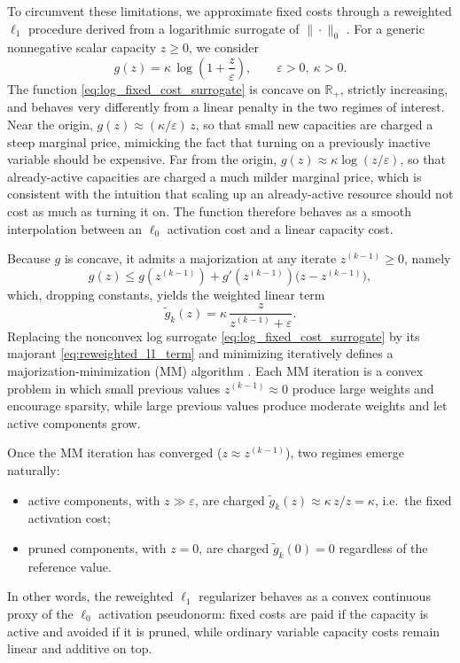 To circumvent these limitations, we approximate fixed costs through a reweighted $\ell_1$ procedure derived from a logarithmic surrogate of $\|\cdot\|_0$ \cite{CandesWakinBoyd2008}. For a generic nonnegative scalar capacity $z\ge 0$, we consider
\begin{equation}
g(z)=\kappa\,\log\!\left(1+\frac{z}{\varepsilon}\right),
\qquad \varepsilon>0,\ \kappa>0.
\label{eq:log_fixed_cost_surrogate}
\end{equation}
The function \eqref{eq:log_fixed_cost_surrogate} is concave on $\mathbb{R}_+$, strictly increasing, and behaves very differently from a linear penalty in the two regimes of interest. Near the origin, $g(z)\approx (\kappa/\varepsilon)\,z$, so that small new capacities are charged a steep marginal price, mimicking the fact that turning on a previously inactive variable should be expensive. Far from the origin, $g(z)\approx\kappa\log(z/\varepsilon)$, so that already-active capacities are charged a much milder marginal price, which is consistent with the intuition that scaling up an already-active resource should not cost as much as turning it on. The function therefore behaves as a smooth interpolation between an $\ell_0$ activation cost and a linear capacity cost.

Because $g$ is concave, it admits a majorization at any iterate $z^{(k-1)}\ge 0$, namely
\begin{equation}
g(z)\le g(z^{(k-1)})+g'(z^{(k-1)})\bigl(z-z^{(k-1)}\bigr),
\label{eq:majorization_log}
\end{equation}
which, dropping constants, yields the weighted linear term
\begin{equation}
\widetilde g_k(z)=\kappa\,\frac{z}{z^{(k-1)}+\varepsilon}.
\label{eq:reweighted_l1_term}
\end{equation}
Replacing the nonconvex log surrogate \eqref{eq:log_fixed_cost_surrogate} by its majorant \eqref{eq:reweighted_l1_term} and minimizing iteratively defines a majorization-minimization (MM) algorithm \cite{CandesWakinBoyd2008,RealRojas2026TRB}. Each MM iteration is a convex problem in which small previous values $z^{(k-1)}\approx 0$ produce large weights and encourage sparsity, while large previous values produce moderate weights and let active components grow.

Once the MM iteration has converged ($z\approx z^{(k-1)}$), two regimes emerge naturally:
\begin{itemize}
\item active components, with $z\gg\varepsilon$, are charged $\widetilde g_k(z)\approx\kappa\,z/z=\kappa$, i.e.\ the fixed activation cost;
\item pruned components, with $z=0$, are charged $\widetilde g_k(0)=0$ regardless of the reference value.
\end{itemize}
In other words, the reweighted $\ell_1$ regularizer behaves as a convex continuous proxy of the $\ell_0$ activation pseudonorm: fixed costs are paid if the capacity is active and avoided if it is pruned, while ordinary variable capacity costs remain linear and additive on top.

